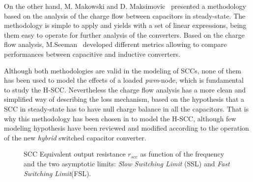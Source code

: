 On the other hand,  M. Makowski and D. Maksimovic~\cite{95Makowski} presented a methodology based on the analysis of the charge flow between capacitors in steady-state. The methodology is simple to apply and yields with a set of linear expressions, being them easy to operate for further analysis of the converters. Based on the charge flow analysis, M.Seeman~\cite{Seeman:EECS-2009-78} developed different metrics allowing to compare performances between capacitive and inductive converters.

Although both methodologies are valid in the modeling of SCCs, none of them has been used to model the effects of a loaded \emph{pwm}-node, which is fundamental to study the H-SCC.  Nevertheless the charge flow analysis has a more clean and simplified way of describing the loss mechanism, based on the hypothesis that a SCC in steady-state has to have null charge balance in all the capacitors. That is why this methodology has been chosen in to model the H-SCC, although few modeling hypothesis have been reviewed and modified according to the operation of the new \emph{hybrid} switched capacitor converter.

\begin{SCfigure} %
\centering
{}
\caption{SCC Equivalent output resistance $r_{scc}$ as function of the frequency and the two asymptotic limits: \emph{Slow Switching Limit} (SSL) and \emph{Fast Switching Limit}(FSL). }
\label{fig:plot_rscc}
\end{SCfigure}

